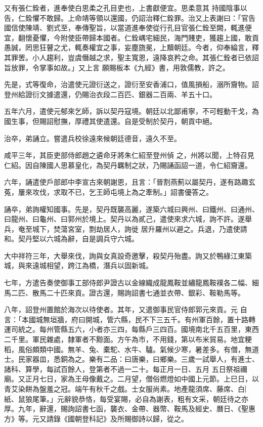 \begin{pinyinscope}
 又有張仁銓者，進奉使白思柔之孔目吏也，上書獻便宜。思柔意其
 持國陰事以告，仁銓懼不敢歸。上命靖等領以還國，仍詔治釋仁銓罪。治又上表謝曰：「官告國信使陳靖、劉式至，奉傳聖旨，以當道進奉使從行孔目官張仁銓至闕，輒進便宜，翻懷憂懼，今附使臣帶歸本國者。仁銓嵎宅細民，海門賤吏，獲趨上國，敢貢愚誠，罔思狂瞽之尤，輒奏權宜之事，妄塵旒冕，上黷朝廷。今者，仰奉綸言，釋其罪罟。小人趨利，豈虞僭越之求，聖主寬恩，遠降哀矜之命。其張仁銓者已依詔旨放罪，令掌事如故。」又上言
 願賜板本《九經》書，用敦儒教，許之。



 先是，式等復命，治遣使元證衍送之，證衍至安香浦口，值風損船，溺所齎物。詔登州給證衍文據遣還，仍賜治衣段二百匹、銀器二百兩、羊五十口。



 五年六月，遣使元郁來乞師，訴以契丹寇境。朝廷以北鄙甫寧，不可輕動干戈，為國生事，但賜詔慰撫，厚禮其使遣還。自是受制於契丹，朝貢中絕。



 治卒，弟誦立。嘗遣兵校徐遠來候朝廷德音，遠久不至。



 咸平三年，其臣吏部侍郎趙之遴命牙將朱仁紹至登州偵
 之，州將以聞，上特召見仁紹。因自陳國人思慕皇化，為契丹羈制之狀，乃賜誦函詔一道，令仁紹齎還。



 六年，誦遣使戶部郎中李宣古來朝謝恩，且言：「晉割燕薊以屬契丹，遂有路趣玄菟，屢來攻伐，求取不已，乞王師屯境上為之牽制。」詔書優答之。



 誦卒，弟詢權知國事。先是，契丹既襲高麗，遂築六城曰興州、曰鐵州、曰通州、曰龍州、曰龜州、曰郭州於境上。契丹以為貳己，遣使來求六城，詢不許。遂舉兵，奄至城下，焚蕩宮室，剽劫居人，詢徙
 居升羅州以避之。兵退，乃遣使請和。契丹堅以六城為辭，自是調兵守六城。



 大中祥符三年，大舉來伐，詢與女真設奇邀擊，殺契丹殆盡。詢又於鴨綠江東築城，與來遠城相望，跨江為橋，潛兵以固新城。



 七年，方遣告奏使御事工部侍郎尹證古以金線織成龍鳳鞍並繡龍鳳鞍襆各二幅、細馬二匹、散馬二十匹來貢。證古還，賜詢詔書七通並衣帶、銀彩、鞍勒馬等。



 八年，詔登州置館於海次以待使者。其年，又遣御事民官侍郎郭元來貢。元
 自言：「本國城無垣牆，府曰開城，管六縣，民不下三五千。有州軍百餘，置十路轉運司統之。每州管縣五六，小者亦三四，每縣戶三四百。國境南北千五百里，東西二千里。軍民雜處，隸軍者不黥面。方午為市，不用錢，第以布米貿易。地宜粳稻，風俗頗類中國。無羊、兔、橐駝、水牛、驢。氣候少寒，暑差多。有僧，無道士。民家器皿，悉銅為之。樂有二品：曰唐樂，曰鄉樂。三歲一試舉人，有進士、諸科、算學，每試百餘人，登第者不過一二十。每正月一日、五月
 五日祭祖禰廟。又正月七日，家為王母像戴之。二月望，僧俗燃燈如中國上元節。上巳日，以青艾染餅為盤羞之冠。端午有秋千之戲。士女服尚素。地產龍須席、藤席、白︴紙、鼠狼尾筆。」元辭貌恭恪，每受宴賜，必自為謝表，粗有文采，朝廷待之亦厚。九年，辭還，賜詢詔書七函，襲衣、金帶、器幣、鞍馬及經史、曆日、《聖惠方》等。元又請錄《國朝登科記》及所賜御詩以歸，從之。




\end{pinyinscope}
